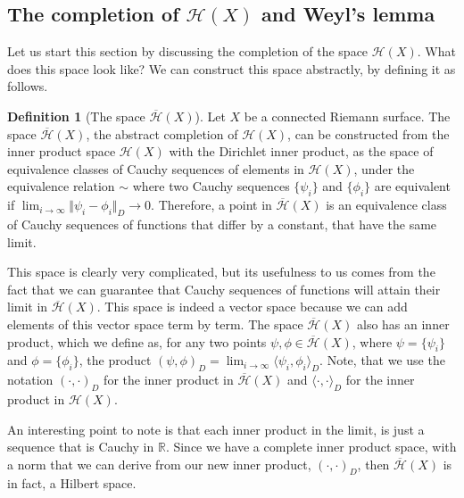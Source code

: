 \documentclass[11pt]{report}
\theoremstyle{definition}
\newtheorem{defn}[thm]{Definition}
\begin{document}
\subsection{The completion of $\mathcal{H}(X)$ and Weyl's lemma}
Let us start this section by discussing the completion of the space $\mathcal{H}(X)$. What does this space look like? We can construct this space abstractly, by defining it as follows.
\begin{defn}[The space $\overline{\mathcal{H}}(X)$]\label{completeH}
  Let $X$ be a connected Riemann surface. The space $\overline{\mathcal{H}}(X)$, the abstract completion of $\mathcal{H}(X)$, can be constructed from the inner product space $\mathcal{H}(X)$ with the Dirichlet inner product, as the space of equivalence classes of Cauchy sequences of elements in $\mathcal{H}(X)$, under the equivalence relation $\sim$ where two Cauchy sequences $\{\psi_i\}$ and $\{\phi_i\}$ are equivalent if $\lim_{i \rightarrow \infty}\Vert \psi_i - \phi_i\Vert_D \rightarrow 0 $.
  Therefore, a point in $\overline{\mathcal{H}}(X)$ is an equivalence class of Cauchy sequences of functions that differ by a constant, that have the same limit.
\end{defn}
This space is clearly very complicated, but its usefulness to us comes from the fact that we can guarantee that Cauchy sequences of functions will attain their limit in $\overline{\mathcal{H}}(X)$. This space is indeed a vector space because we can add elements of this vector space term by term. The space $\overline{\mathcal{H}}(X)$ also has an inner product, which we define as, for any two points $\psi, \phi \in \overline{\mathcal{H}}(X)$, where $\psi = \{\psi_i\}$ and $\phi = \{\phi_i\}$, the product $( \psi, \phi )_D = \lim_{i \rightarrow \infty} \langle \psi_i, \phi_i \rangle_D$. Note, that we use the notation $( \cdot, \cdot)_D$ for the inner product in $\overline{\mathcal{H}}(X)$ and $\langle \cdot, \cdot \rangle_D$ for the inner product in $\mathcal{H}(X)$.

An interesting point to note is that each inner product in the limit, is just a sequence that is Cauchy in $\mathbb{R}$. Since we have a complete inner product space, with a norm that we can derive from our new inner product, $( \cdot, \cdot )_D$, then $\overline{\mathcal{H}}(X)$ is in fact, a Hilbert space. 
\end{document}
